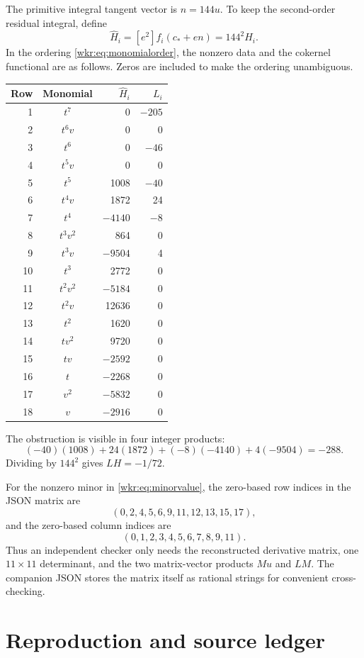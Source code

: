 \documentclass[11pt,a4paper]{article}
\numberwithin{equation}{section}
\theoremstyle{definition}
\theoremstyle{remark}
\newcommand{\cstar}{c_*}
\begin{document}
The primitive integral tangent vector is $n=144u$. To keep the second-order
residual integral, define
\[
\widehat H_i=[e^2]f_i(\cstar+en)=144^2 H_i.
\]
In the ordering \eqref{wkr:eq:monomialorder}, the nonzero data and the
cokernel functional are as follows. Zeros are included to make the ordering
unambiguous.
\begin{center}
\begin{tabular}{@{}rcrr@{}}
\toprule
Row & Monomial & $\widehat H_i$ & $L_i$\\
\midrule
1 & $t^7$ & 0 & $-205$\\
2 & $t^6v$ & 0 & 0\\
3 & $t^6$ & 0 & $-46$\\
4 & $t^5v$ & 0 & 0\\
5 & $t^5$ & 1008 & $-40$\\
6 & $t^4v$ & 1872 & 24\\
7 & $t^4$ & $-4140$ & $-8$\\
8 & $t^3v^2$ & 864 & 0\\
9 & $t^3v$ & $-9504$ & 4\\
10 & $t^3$ & 2772 & 0\\
11 & $t^2v^2$ & $-5184$ & 0\\
12 & $t^2v$ & 12636 & 0\\
13 & $t^2$ & 1620 & 0\\
14 & $tv^2$ & 9720 & 0\\
15 & $tv$ & $-2592$ & 0\\
16 & $t$ & $-2268$ & 0\\
17 & $v^2$ & $-5832$ & 0\\
18 & $v$ & $-2916$ & 0\\
\bottomrule
\end{tabular}
\end{center}
The obstruction is visible in four integer products:
\[
(-40)(1008)+24(1872)+(-8)(-4140)+4(-9504)=-288.
\]
Dividing by $144^2$ gives $LH=-1/72$.

For the nonzero minor in \eqref{wkr:eq:minorvalue}, the zero-based row indices
in the JSON matrix are
\[
(0,2,4,5,6,9,11,12,13,15,17),
\]
and the zero-based column indices are
\[
(0,1,2,3,4,5,6,7,8,9,11).
\]
Thus an independent checker only needs the reconstructed derivative
matrix, one $11\times11$ determinant, and the two matrix-vector products
$Mu$ and $LM$. The companion JSON stores the matrix itself as rational
strings for convenient cross-checking.

\section{Reproduction and source ledger}
\label{wkr:app:reproduction}
\end{document}
